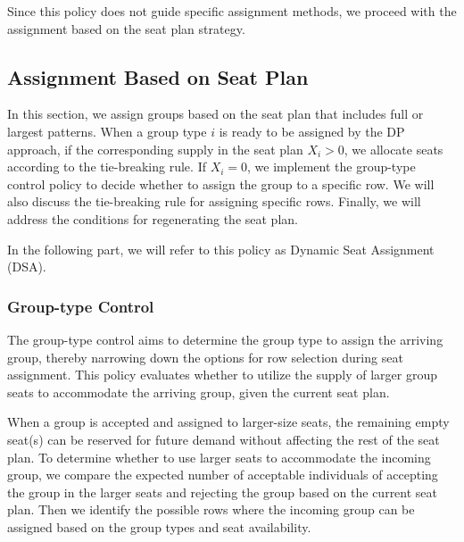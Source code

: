Since this policy does not guide specific assignment methods, we proceed with the assignment based on the seat plan strategy.

\subsection{Assignment Based on Seat Plan}
In this section, we assign groups based on the seat plan that includes full or largest patterns. When a group type $i$ is ready to be assigned by the DP approach, if the corresponding supply in the seat plan $X_{i} > 0$, we allocate seats according to the tie-breaking rule. If $X_{i} = 0$, we implement the group-type control policy to decide whether to assign the group to a specific row. We will also discuss the tie-breaking rule for assigning specific rows. Finally, we will address the conditions for regenerating the seat plan.

In the following part, we will refer to this policy as Dynamic Seat Assignment (DSA).


\subsubsection{Group-type Control}\label{nested_policy}
The group-type control aims to determine the group type to assign the arriving group, thereby narrowing down the options for row selection during seat assignment. This policy evaluates whether to utilize the supply of larger group seats to accommodate the arriving group, given the current seat plan. 



When a group is accepted and assigned to larger-size seats, the remaining empty seat(s) can be reserved for future demand without affecting the rest of the seat plan. To determine whether to use larger seats to accommodate the incoming group, we compare the expected number of acceptable individuals of accepting the group in the larger seats and rejecting the group based on the current seat plan. Then we identify the possible rows where the incoming group can be assigned based on the group types and seat availability.

